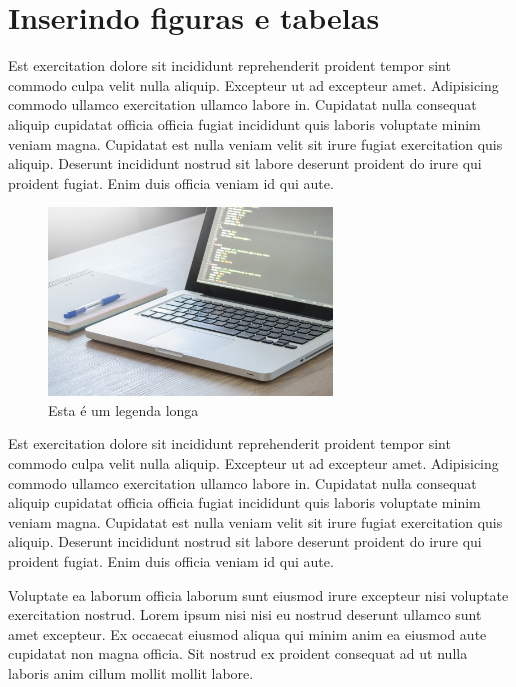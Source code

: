\documentclass[12pt]{report}
\begin{document}
\tableofcontents
\newpage

\listoffigures
\newpage

\listoftables
\newpage


\section{Inserindo figuras e tabelas}

Est exercitation dolore sit incididunt reprehenderit proident tempor sint commodo culpa velit nulla aliquip. Excepteur ut ad excepteur amet. Adipisicing commodo ullamco exercitation ullamco labore in. Cupidatat nulla consequat aliquip cupidatat officia officia fugiat incididunt quis laboris voluptate minim veniam magna. Cupidatat est nulla veniam velit sit irure fugiat exercitation quis aliquip. Deserunt incididunt nostrud sit labore deserunt proident do irure qui proident fugiat. Enim duis officia veniam id qui aute.

\begin{figure}[H]
    \centering
    \includegraphics[height=5cm]{img/img}
    \caption[Programando]{Esta é um legenda longa}
    \label{fig:prog}
\end{figure}

Est exercitation dolore sit incididunt reprehenderit proident tempor sint commodo culpa velit nulla aliquip. Excepteur ut ad excepteur amet. Adipisicing commodo ullamco exercitation ullamco labore in. Cupidatat nulla consequat aliquip cupidatat officia officia fugiat incididunt quis laboris voluptate minim veniam magna. Cupidatat est nulla veniam velit sit irure fugiat exercitation quis aliquip. Deserunt incididunt nostrud sit labore deserunt proident do irure qui proident fugiat. Enim duis officia veniam id qui aute.

Voluptate ea laborum officia laborum sunt eiusmod irure excepteur nisi voluptate exercitation nostrud. Lorem ipsum nisi nisi eu nostrud deserunt ullamco sunt amet excepteur. Ex occaecat eiusmod aliqua qui minim anim ea eiusmod aute cupidatat non magna officia. Sit nostrud ex proident consequat ad ut nulla laboris anim cillum mollit mollit labore.
\end{document}

